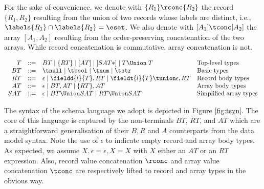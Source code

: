 For the sake of convenience, we denote with $\{R_1\} \rconc \{R_2\}$ the record $\{R_1, R_2\}$ resulting from the union of two records whose labels are distinct, i.e., $\labels{R_1}\cap\labels{R_2}=\eset$.
We also denote  with $[A_1] \tconc [A_2]$ the array $[A_1, A_2]$ resulting from the order-preserving concatenation of the two arrays.
While record concatenation is commutative, array concatenation is not. 


\begin{figure*}[ht]
\[
\begin{array}{r*{3}{l}}
T 	&::= & BT   \mid  \{ RT\}   \mid  [AT]   \mid  [SAT*]  \mid   T\Union\; T  & \text{Top-level types} \\ %
BT 	&::= &  \tnull  \mid \tbool \mid \tnum \mid \tstr   & \text{Basic types} \\
RT   &::=&   \epsilon \mid \fieldd{l}{T}, RT \mid  \fieldt{l}{T}\tunion\epsilon, RT  & \text{Record body types} \\
AT    &::= &  \epsilon   \mid  BT , AT  \mid  \{RT\} , AT  & \text{Array body types} \\
SAT    &::= &  \epsilon   \mid BT \Union SAT    \mid RT \Union SAT & \text{Simplified array types} \\

\end{array}
\]

\caption{Syntax of the JSON type language.}
\label{fig:tsyn}
\end{figure*}

\medskip
The syntax of the \json\/  schema language we adopt  is depicted in Figure \ref{fig:tsyn}.
The core of this language is captured by the non-terminals $BT$, $RT$, and $AT$ which are a straightforward generalisation of their $B, R$ and $A$ counterparts from the data model syntax. Note the use of $\epsilon$ to indicate empty record and array body types. As expected, we assume $X,\epsilon=\epsilon, X=X$ with $X$ either an $AT$ or an $RT$ expression. Also, record value concatenation $\rconc$ and array value  concatenation  $\tconc$ are respectively lifted to record and array types in the obvious way. 


